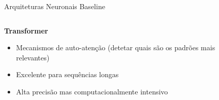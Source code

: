 \documentclass[aspectratio=169,xcolor=dvipsnames]{beamer}
\begin{document}
\begin{frame}{Arquiteturas Neuronais Baseline}
  \begin{columns}[T]
    \begin{column}{0.5\textwidth}
      \textbf{Transformer}
      \begin{itemize}
        \item Mecanismos de auto-atenção (detetar quais são os padrões mais relevantes)
        \item Excelente para sequências longas
        \item Alta precisão mas computacionalmente intensivo
      \end{itemize}
    \end{column}
    \begin{column}{0.5\textwidth}
      \centering
    \end{column}
  \end{columns}
\end{frame}
\end{document}
